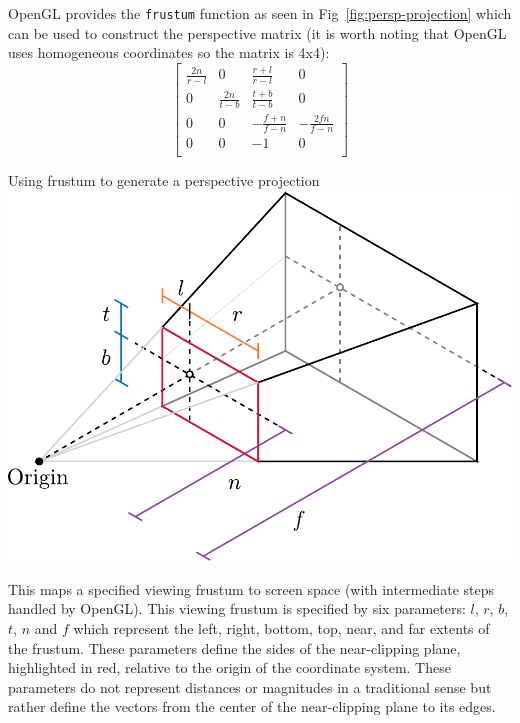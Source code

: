 OpenGL provides the \texttt{frustum} function as seen in Fig~\ref{fig:persp-projection} which can be used to construct the perspective matrix (it is worth noting that OpenGL uses homogeneous coordinates so the matrix is 4x4):  \\    
\[
    \begin{bmatrix}
        \frac{2n}{r-l} & 0              & \frac{r+l}{r-l}  & 0                \\
        0              & \frac{2n}{t-b} & \frac{t+b}{t-b}  & 0                \\
        0              & 0              & -\frac{f+n}{f-n} & -\frac{2fn}{f-n} \\
        0              & 0              & -1               & 0                \\
    \end{bmatrix}
\] 

\begin{figureBox}[label={fig:persp-projection}, width=0.75\linewidth]{Using frustum to generate a perspective projection}
    \includegraphics[width = 0.8\linewidth]{./background/figures/projection/persp-projection.pdf}
\end{figureBox}


This maps a specified viewing frustum to screen space (with intermediate steps handled by OpenGL). This viewing frustum is specified by six parameters: $l$, $r$, $b$, $t$, $n$ and $f$ which represent the left, right, bottom, top, near, and far extents of the frustum. These parameters define the sides of the near-clipping plane, highlighted in red, relative to the origin of the coordinate system. These parameters do not represent distances or magnitudes in a traditional sense but rather define the vectors from the center of the near-clipping plane to its edges. \\



